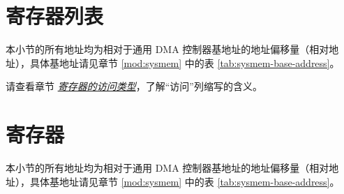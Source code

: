 \documentclass[main\_\_CN.tex]{subfiles}
\begin{document}

\clearpage
\section{寄存器列表}
\label{sec:dma-reg-summ}
\hypertarget{dma-reg-summ}{}

本小节的所有地址均为相对于通用 DMA 控制器基地址的地址偏移量（相对地址），具体基地址请见章节 \ref{mod:sysmem} \textit{} 中的表 \ref{tab:sysmem-base-address}。

请查看章节 \hyperref[glossary-access-types]{\textit{寄存器的访问类型}}，了解“访问”列缩写的含义。





\clearpage
\section{寄存器}

本小节的所有地址均为相对于通用 DMA 控制器基地址的地址偏移量（相对地址），具体基地址请见章节 \ref{mod:sysmem} \textit{} 中的表 \ref{tab:sysmem-base-address}。


\end{document}
